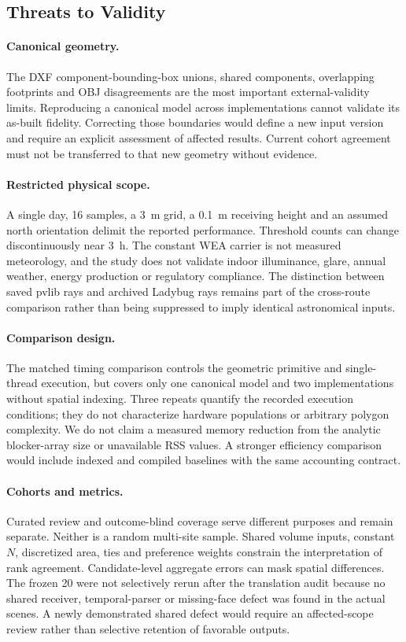 \documentclass{llncs}
\begin{document}
\subsection{Threats to Validity}
\paragraph{Canonical geometry.} The DXF component-bounding-box unions, shared components, overlapping footprints and OBJ disagreements are the most important external-validity limits. Reproducing a canonical model across implementations cannot validate its as-built fidelity. Correcting those boundaries would define a new input version and require an explicit assessment of affected results. Current cohort agreement must not be transferred to that new geometry without evidence.

\paragraph{Restricted physical scope.} A single day, 16 samples, a 3~m grid, a 0.1~m receiving height and an assumed north orientation delimit the reported performance. Threshold counts can change discontinuously near 3~h. The constant WEA carrier is not measured meteorology, and the study does not validate indoor illuminance, glare, annual weather, energy production or regulatory compliance. The distinction between saved pvlib rays and archived Ladybug rays remains part of the cross-route comparison rather than being suppressed to imply identical astronomical inputs.

\paragraph{Comparison design.} The matched timing comparison controls the geometric primitive and single-thread execution, but covers only one canonical model and two implementations without spatial indexing. Three repeats quantify the recorded execution conditions; they do not characterize hardware populations or arbitrary polygon complexity. We do not claim a measured memory reduction from the analytic blocker-array size or unavailable RSS values. A stronger efficiency comparison would include indexed and compiled baselines with the same accounting contract.

\paragraph{Cohorts and metrics.} Curated review and outcome-blind coverage serve different purposes and remain separate. Neither is a random multi-site sample. Shared volume inputs, constant $N$, discretized area, ties and preference weights constrain the interpretation of rank agreement. Candidate-level aggregate errors can mask spatial differences. The frozen 20 were not selectively rerun after the translation audit because no shared receiver, temporal-parser or missing-face defect was found in the actual scenes. A newly demonstrated shared defect would require an affected-scope review rather than selective retention of favorable outputs.
\end{document}
